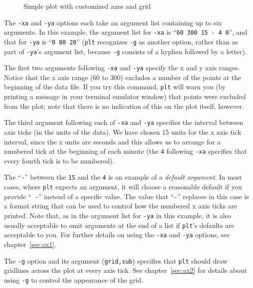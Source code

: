 \documentclass{book}
\begin{document}
\begin{figure}
\begin{center}
\caption{Simple plot with customized axes and grid \label{fig:simple3}}
\end{center}
\end{figure}

The {\tt -xa} and {\tt -ya} options each take an argument list
containing up to six arguments.  In this example, the argument list
for {\tt -xa} is ``{\tt 60 300 15 - 4 0}'', and that for {\tt -ya}
is ``{\tt 0 80 20}'' ({\tt plt} recognizes {\tt -g} as another option,
rather than as part of {\tt -ya}'s argument list, because {\tt -g}
consists of a hyphen followed by a letter).

The first two arguments following {\tt -xa} and {\tt -ya} specify the
x and y axis ranges.  Notice that the x axis range (60 to 300)
excludes a number of the points at the beginning of the data file.  If
you try this command, {\tt plt} will warn you (by printing a message
in your terminal emulator window) that points were excluded from the
plot;  note that there is no indication of this on the plot itself,
however.

The third argument following each of {\tt -xa} and {\tt -ya} specifies
the interval between axis ticks (in the units of the data).  We have
chosen 15 units for the x axis tick interval, since the x units are
seconds and this allows us to arrange for a numbered tick at the
beginning of each minute (the {\tt 4} following {\tt -xa} specifies
that every fourth tick is to be numbered).

The ``{\tt -}'' between the {\tt 15} and the {\tt 4} is an example of
a {\em default argument}.  In most cases, where {\tt plt} expects an
argument, it will choose a reasonable default if you provide ``{\tt
-}'' instead of a specific value.  The value that ``{\tt -}'' replaces
in this case is a format string that can be used to control how the
numbered x axis ticks are printed.  Note that, as in the argument list
for {\tt -ya} in this example, it is also usually acceptable to omit
arguments at the end of a list if {\tt plt}'s defaults are acceptable
to you.  For further details on using the
{\tt -xa} and {\tt -ya} options, see chapter~\ref{sec:ax1}.

The {\tt -g} option and its argument ({\tt grid,sub}) specifies that
{\tt plt} should draw gridlines across the plot at every axis tick.
See chapter~\ref{sec:ax2} for details about using {\tt -g} to control
the appearance of the grid.
\end{document}
